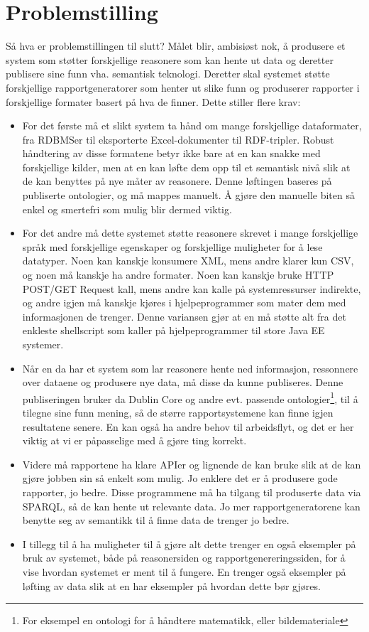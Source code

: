 \documentclass[11pt]{article}
\begin{document}
\section{Problemstilling}
Så hva er problemstillingen til slutt?
Målet blir, ambisiøst nok, å produsere et system som støtter forskjellige reasonere som kan hente ut data og deretter publisere sine funn vha. semantisk teknologi. Deretter skal systemet støtte forskjellige rapportgeneratorer som henter ut slike funn og produserer rapporter i forskjellige formater basert på hva de finner.
Dette stiller flere krav:
\begin{itemize}
\item For det første må et slikt system ta hånd om mange forskjellige dataformater, fra RDBMSer til eksporterte Excel-dokumenter til RDF-tripler.
  Robust håndtering av disse formatene betyr ikke bare at en kan snakke med forskjellige kilder, men at en kan løfte dem opp til et semantisk nivå slik at de kan benyttes på nye måter av reasonere. Denne løftingen baseres på publiserte ontologier, og må mappes manuelt. Å gjøre den manuelle biten så enkel og smertefri som mulig blir dermed viktig.
\item For det andre må dette systemet støtte reasonere skrevet i mange forskjellige språk med forskjellige egenskaper og forskjellige muligheter for å lese datatyper. Noen kan kanskje konsumere XML, mens andre klarer kun CSV, og noen må kanskje ha andre formater. Noen kan kanskje bruke HTTP POST/GET Request kall, mens andre kan kalle på systemressurser indirekte, og andre igjen må kanskje kjøres i hjelpeprogrammer som mater dem med informasjonen de trenger. Denne variansen gjør at en må støtte alt fra det enkleste shellscript som kaller på hjelpeprogrammer til store Java EE systemer.
\item Når en da har et system som lar reasonere hente ned informasjon, ressonnere over dataene og produsere nye data, må disse da kunne publiseres. Denne publiseringen bruker da Dublin Core og andre evt. passende ontologier\footnote{For eksempel en ontologi for å håndtere matematikk, eller bildemateriale}, til å tilegne sine funn mening, så de større rapportsystemene kan finne igjen resultatene senere. En kan også ha andre behov til arbeidsflyt, og det er her viktig at vi er påpasselige med å gjøre ting korrekt.
\item Videre må rapportene ha klare APIer og lignende de kan bruke slik at de kan gjøre jobben sin så enkelt som mulig. Jo enklere det er å produsere gode rapporter, jo bedre. Disse programmene må ha tilgang til produserte data via SPARQL, så de kan hente ut relevante data. Jo mer rapportgeneratorene kan benytte seg av semantikk til å finne data de trenger jo bedre.
\item I tillegg til å ha muligheter til å gjøre alt dette trenger en også eksempler på bruk av systemet, både på reasonersiden og rapportgenereringssiden, for å vise hvordan systemet er ment til å fungere. En trenger også eksempler på løfting av data slik at en har eksempler på hvordan dette bør gjøres.
\end{itemize}
\end{document}
